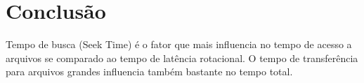\documentclass[12pt,a4paper]{article}
\begin{document}
\section{Conclusão}
Tempo de busca (Seek Time) é o fator que mais influencia no tempo de
acesso a arquivos se comparado ao tempo de latência rotacional.
O tempo de transferência para arquivos grandes influencia também
bastante no tempo total.
%
%  
\end{document}
